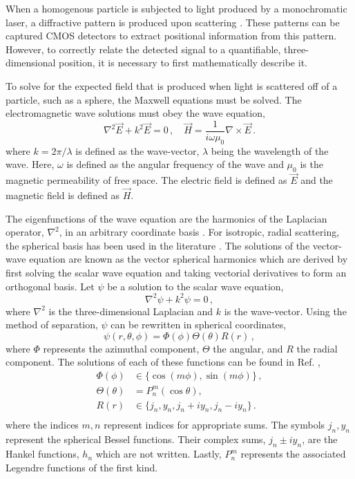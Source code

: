 When a homogenous particle is subjected to light produced by a monochromatic laser, a diffractive pattern is produced upon scattering \cite{bohren1983absorption,Steck2021,jackson_classical_1999}. These patterns can be captured CMOS detectors to extract positional information from this pattern. However, to correctly relate the detected signal to a quantifiable, three-dimensional position, it is necessary to first mathematically describe it. 

To solve for the expected field that is produced when light is scattered off of a particle, such as a sphere, the Maxwell equations must be solved. The electromagnetic wave solutions must obey the wave equation,
\begin{equation}
    \nabla^2 \vec E + k^2 \vec E = 0\,, \quad \vec H = \frac{1}{i \omega \mu_0} \nabla \times \vec E \,.
\end{equation}
where $k = 2\pi/\lambda$ is defined as the wave-vector, $\lambda$ being the wavelength of the wave. Here, $\omega$ is defined as the angular frequency of the wave and $\mu_0$ is the magnetic permeability of free space. The electric field is defined as $\vec E$ and the magnetic field is defined as $\vec H$.

The eigenfunctions of the wave equation are the harmonics of the Laplacian operator, $\nabla^2$, in an arbitrary coordinate basis \cite{jackson_classical_1999, strauss2007pde, zangwill2013modern}. For isotropic, radial scattering, the spherical basis has been used in the literature \cite{bohren1983absorption}. The solutions of the vector-wave equation are known as the vector spherical harmonics which are derived by first solving the scalar wave equation and taking vectorial derivatives to form an orthogonal basis. Let $\psi$ be a solution to the scalar wave equation,
\begin{equation}
    \nabla^2 \psi + k^2 \psi = 0\,,
\end{equation} where $\nabla^2$ is the three-dimensional Laplacian and $k$ is the wave-vector. Using the method of separation, $\psi$ can be rewritten in spherical coordinates,
\begin{equation}
    \psi(r, \theta, \phi) = \Phi(\phi) \Theta(\theta) R(r)\,,
\end{equation}
where $\Phi$ represents the azimuthal component, $\Theta$ the angular, and $R$ the radial component. The solutions of each of these functions can be found in Ref. \cite{jackson_classical_1999},
\begin{equation}
    \begin{aligned}
        \Phi(\phi) & \in \{\cos(m\phi), \sin(m\phi)\}\,, \\
        \Theta(\theta) &= P^m_n(\cos\theta),\\
        R(r) &\in \{j_n, y_n, j_n + i y_n, j_n - i y_n\}\,. \\
    \end{aligned}
\end{equation}
where the indices $m,n$ represent indices for appropriate sums.
The symbols $j_n, y_n$ represent the spherical Bessel functions. Their complex sums, $j_n \pm i y_n$, are the Hankel functions, $h_n$ which are not written. Lastly, $P^m_n$ represents the associated Legendre functions of the first kind. 

